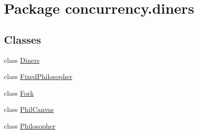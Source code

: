 \hypertarget{namespaceconcurrency_1_1diners}{}\section{Package concurrency.\+diners}
\label{namespaceconcurrency_1_1diners}
\subsection*{Classes}
\begin{DoxyCompactItemize}
\item 
class \mbox{\hyperlink{classconcurrency_1_1diners_1_1_diners}{Diners}}
\item 
class \mbox{\hyperlink{classconcurrency_1_1diners_1_1_fixed_philosopher}{Fixed\+Philosopher}}
\item 
class \mbox{\hyperlink{classconcurrency_1_1diners_1_1_fork}{Fork}}
\item 
class \mbox{\hyperlink{classconcurrency_1_1diners_1_1_phil_canvas}{Phil\+Canvas}}
\item 
class \mbox{\hyperlink{classconcurrency_1_1diners_1_1_philosopher}{Philosopher}}
\end{DoxyCompactItemize}
